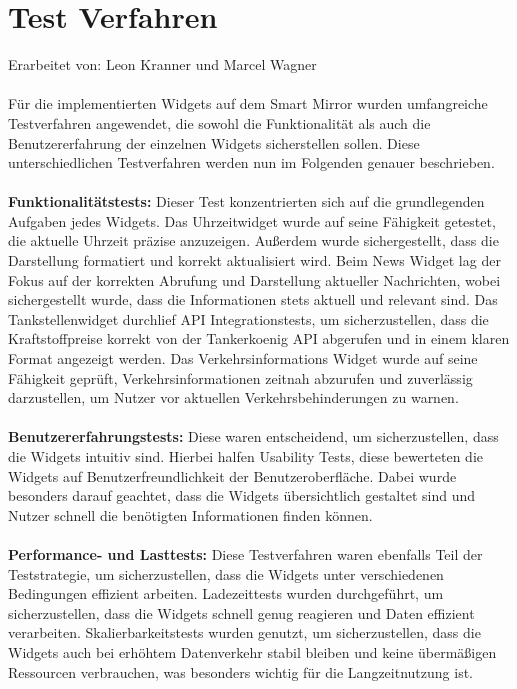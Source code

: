 \newpage

\section{Test Verfahren}
Erarbeitet von: Leon Kranner und Marcel Wagner \\ \\
\noindent
Für die implementierten Widgets auf dem Smart Mirror wurden umfangreiche Testverfahren angewendet, die sowohl die Funktionalität als auch die Benutzererfahrung der einzelnen Widgets sicherstellen sollen. Diese unterschiedlichen Testverfahren werden nun im Folgenden genauer beschrieben. \\ \\
\noindent
\textbf{Funktionalitätstests:} Dieser Test konzentrierten sich auf die grundlegenden Aufgaben jedes Widgets. Das Uhrzeitwidget wurde auf seine Fähigkeit getestet, die aktuelle Uhrzeit präzise anzuzeigen. Außerdem wurde sichergestellt, dass die Darstellung formatiert und korrekt aktualisiert wird. Beim News Widget lag der Fokus auf der korrekten Abrufung und Darstellung aktueller Nachrichten, wobei sichergestellt wurde, dass die Informationen stets aktuell und relevant sind. Das Tankstellenwidget durchlief API Integrationstests, um sicherzustellen, dass die Kraftstoffpreise korrekt von der Tankerkoenig API abgerufen und in einem klaren Format angezeigt werden. Das Verkehrsinformations Widget wurde auf seine Fähigkeit geprüft, Verkehrsinformationen zeitnah abzurufen und zuverlässig darzustellen, um Nutzer vor aktuellen Verkehrsbehinderungen zu warnen. \\ \\
\noindent
\textbf{Benutzererfahrungstests:} Diese waren entscheidend, um sicherzustellen, dass die Widgets intuitiv sind. Hierbei halfen Usability Tests, diese bewerteten die Widgets auf Benutzerfreundlichkeit der Benutzeroberfläche. Dabei wurde besonders darauf geachtet, dass die Widgets übersichtlich gestaltet sind und Nutzer schnell die benötigten Informationen finden können. \\ \\
\noindent
\textbf{Performance- und Lasttests:} Diese Testverfahren waren ebenfalls Teil der Teststrategie, um sicherzustellen, dass die Widgets unter verschiedenen Bedingungen effizient arbeiten. Ladezeittests wurden durchgeführt, um sicherzustellen, dass die Widgets schnell genug reagieren und Daten effizient verarbeiten. Skalierbarkeitstests wurden genutzt, um sicherzustellen, dass die Widgets auch bei erhöhtem Datenverkehr stabil bleiben und keine übermäßigen Ressourcen verbrauchen, was besonders wichtig für die Langzeitnutzung ist. \\ \\
